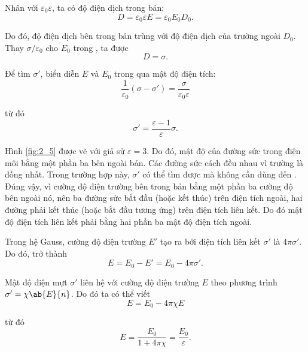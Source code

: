 Nhân  với $\varepsilon_0\varepsilon$, ta có độ điện dịch trong bản:
\begin{equation}\label{eq:2_34}
    D = \varepsilon_0 \varepsilon E = \varepsilon_0 E_0 D_0.
\end{equation}

\noindent
Do đó, độ điện dịch bên trong bản trùng với độ điện dịch của trường ngoài $D_0$. Thay $\sigma/\varepsilon_0$ cho $E_0$ trong , ta được
\begin{equation}\label{eq:2_35}
    D = \sigma.
\end{equation}

Để tìm $\sigma'$, biểu diễn $E$ và $E_0$ trong  qua mật độ điện tích:
\begin{equation*}
    \frac{1}{\varepsilon_0} (\sigma - \sigma') = \frac{\sigma}{\varepsilon_0\varepsilon}
\end{equation*}

\noindent
từ đó
\begin{equation}\label{eq:2_36}
    \sigma' = \frac{\varepsilon - 1}{\varepsilon} \sigma.
\end{equation}

Hình \ref{fig:2_5} được vẽ với giả sử $\varepsilon=3$. Do đó, mật độ của đường sức trong điện môi bằng một phần ba bên ngoài bản. Các đường sức cách đều nhau vì trường là đồng nhất. Trong trường hợp này, $\sigma'$ có thể tìm được mà không cần dùng đến . Đúng vậy, vì cường độ điện trường bên trong bản bằng một phần ba cường độ bên ngoài nó, nên ba đường sức bắt đầu (hoặc kết thúc) trên
điện tích ngoài, hai đường phải kết thúc (hoặc bắt đầu tương ứng) trên điện tích liên kết. Do đó mật độ điện tích liên kết phải bằng hai phần ba mật độ điện tích ngoài.

Trong hệ Gauss, cường độ điện trường $E'$ tạo ra bởi điện tích liên kết $\sigma'$ là $4\pi\sigma'$. Do đó,  trở thành
\begin{equation}\label{eq:2_37}
    E = E_0 - E' = E_0 - 4\pi\sigma'.
\end{equation}

\noindent
Mật độ điện mựt $\sigma'$ liên hệ với cường độ điện trường $E$ theo phương trình $\sigma'=\chi \ab{E}{n}$. Do đó ta có thể viết
\begin{equation*}
    E = E_0 - 4\pi\chi E
\end{equation*}

\noindent
từ đó
\begin{equation*}
    E = \frac{E_0}{1 + 4\pi\chi} = \frac{E_0}{\varepsilon}.
\end{equation*}

